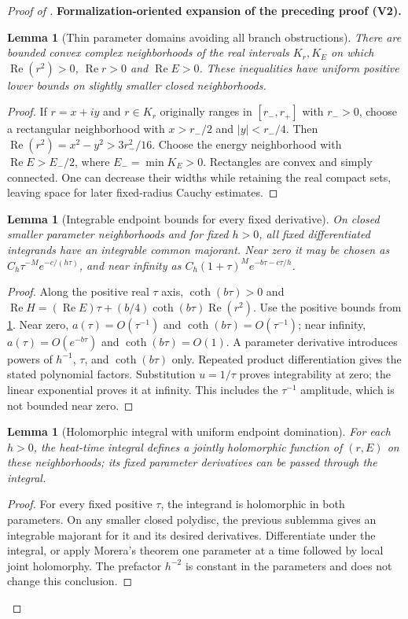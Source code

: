 \documentclass[11pt]{article}
\newtheorem{lemma}[theorem]{Lemma}
\newcommand{\formalisationparentid}{X}
\newenvironment{formalisationaddition}[1]{\par\medskip\begingroup\color{blue}\def\formalisationparentid{#1}\setcounter{formalizationsublemma}{0}\let\lemma\formalizationsublemma\let\endlemma\endformalizationsublemma
  \def\Eo{\mathcal E_h^\circ}\def\EE{\mathcal E_h}\def\phio{\phi_h^\circ}\def\phih{\phi_h}\def\Ho{H_h^{\rm atom}(v^\circ)}\def\Ha{H_h^{\rm atom}}\def\HL{H_h^{L}}\def\Dh{D_h}\def\Log{\operatorname{Log}}\def\ellh{\ell_h}\def\Gp{G_{p,h}}\def\Ast{A_{*,h}}\def\ahat{\widehat{\mathfrak a}_h}\def\ah{\mathfrak a_h}\def\rh{\widehat\rho_h}\def\deltah{\widehat\delta_h}\def\oldref##1{\textup{(##1)}}\def\interface##1{\par\noindent\textit{Analytical interface used here.} ##1\par}\def\finish{\par\noindent\textit{Conclusion of the formalization-oriented expansion.} }\par\noindent\textbf{Formalization-oriented expansion of the preceding proof (V2).}\par\smallskip
}{\par\endgroup\medskip
}
\newcommand{\Rea}{\operatorname{Re}}
\begin{document}
\begin{proof}[Proof of ]
\begin{formalisationaddition}{C-T6.1}
\begin{lemma}[Thin parameter domains avoiding all branch obstructions]\label{sublemma:C6-1-parameter-domains}
There are bounded convex complex neighborhoods of the real intervals
$K_r,K_E$ on which $\Rea(r^2)>0$, $\Rea r>0$ and $\Rea E>0$.
These inequalities have uniform positive lower bounds on slightly
smaller closed neighborhoods.
\end{lemma}
\begin{proof}
If $r=x+iy$ and $r\in K_r$ originally ranges in $[r_-,r_+]$ with
$r_->0$, choose a rectangular neighborhood with $x>r_-/2$ and
$|y|<r_-/4$. Then $\Rea(r^2)=x^2-y^2>3r_-^2/16$.
Choose the energy neighborhood with $\Rea E>E_-/2$, where
$E_- =\min K_E>0$. Rectangles are convex and simply connected.
One can decrease their widths while retaining the real compact sets,
leaving space for later fixed-radius Cauchy estimates.
\end{proof}

\begin{lemma}[Integrable endpoint bounds for every fixed derivative]\label{sublemma:C6-1-endpoint-bounds}
On closed smaller parameter neighborhoods and for fixed $h>0$,
all fixed differentiated integrands have an integrable common majorant.
Near zero it may be chosen as
$C_h\tau^{-M}e^{-c/(h\tau)}$, and near infinity as
$C_h(1+\tau)^M e^{-b\tau-c\tau/h}$.
\end{lemma}
\begin{proof}
Along the positive real $\tau$ axis, $\coth(b\tau)>0$ and
$\Rea H=(\Rea E)\tau+(b/4)\coth(b\tau)\Rea(r^2)$.
Use the positive bounds from \ref{sublemma:C6-1-parameter-domains}.
Near zero, $a(\tau)=O(\tau^{-1})$ and
$\coth(b\tau)=O(\tau^{-1})$; near infinity,
$a(\tau)=O(e^{-b\tau})$ and $\coth(b\tau)=O(1)$.
A parameter derivative introduces powers of $h^{-1}$, $\tau$, and
$\coth(b\tau)$ only. Repeated product differentiation gives the stated
polynomial factors. Substitution $u=1/\tau$ proves integrability at zero;
the linear exponential proves it at infinity. This includes the
$\tau^{-1}$ amplitude, which is not bounded near zero.
\end{proof}

\begin{lemma}[Holomorphic integral with uniform endpoint domination]\label{sublemma:C6-1-holomorphy}
For each $h>0$, the heat-time integral defines a jointly holomorphic
function of $(r,E)$ on these neighborhoods; its fixed parameter
derivatives can be passed through the integral.
\end{lemma}
\begin{proof}
For every fixed positive $\tau$, the integrand is holomorphic in both
parameters. On any smaller closed polydisc, the previous sublemma gives
an integrable majorant for it and its desired derivatives.
Differentiate under the integral, or apply Morera's theorem one
parameter at a time followed by local joint holomorphy.
The prefactor $h^{-2}$ is constant in the parameters and does not
change this conclusion.
\end{proof}


\end{formalisationaddition}
\end{proof}
\end{document}
